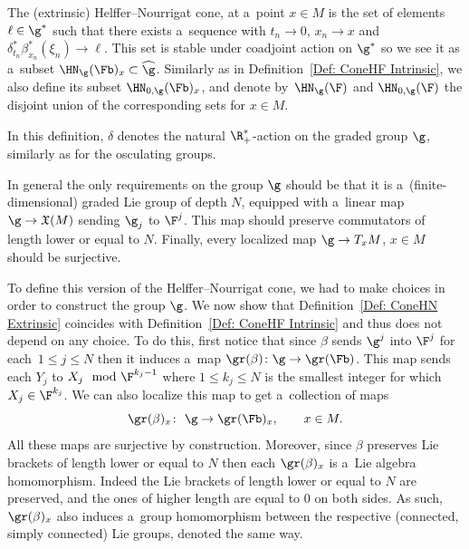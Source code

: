 \begin{mydef}\label{Def: ConeHN Extrinsic}
 The (extrinsic) Helffer--Nourrigat cone, at a~point $x\in M$ is the set of elements~${\ell \in \g^*}$ such that there exists a~sequence  with $t_n\rightarrow 0$, $x_n\rightarrow x$ and $\delta_{t_n}^*\beta_{x_n}^*(\xi_n) \rightarrow \ell$.
 This set is stable under coadjoint action on $\g^*$ so we see it as a~subset $\HN_{\g}(\Fb)_x \subset \widehat{\g}$. Similarly as in Definition~\ref{Def: ConeHF Intrinsic}, we also define its subset $\HN_{0,\g}(\Fb)_x$, and denote by~$\HN_{\g}(\F)$ and $\HN_{0,\g}(\F)$ the disjoint union of the corresponding sets for $x\in M$.
\end{mydef}

In this definition, $\delta$ denotes the natural $\R^*_+$-action on the graded group $\g$, similarly as for the osculating groups.

\begin{rem}
 In general the only requirements on the group $\g$ should be that it is a~(finite-dimensional) graded Lie group of depth $N$, equipped with a~linear map $\g \to \mathfrak{X}(M)$ sending $\g_j$ to $\F^j$. This map should preserve commutators of length lower or equal to $N$. Finally, every localized map $\g \to T_xM$, $x\in M$ should be surjective.
\end{rem}

To define this version of the Helffer--Nourrigat cone, we had to make choices in order to construct the group $\g$. We now show that Definition~\ref{Def: ConeHN Extrinsic} coincides with Definition~\ref{Def: ConeHF Intrinsic} and thus does not depend on any choice. To do this, first notice that since $\beta$ sends $\g^j$ into $\F^j$ for each~${1\leq j \leq N}$ then it induces a~map $\gr(\beta) \colon \g \to \gr(\Fb)$.
This map sends each $Y_j$ to $X_j \mod \F^{k_j-1}$ where $1\leq k_j\leq N$ is the smallest integer for which $X_j \in \F^{k_j}$. We can also localize this map to get a~collection of maps
\[\gr(\beta)_x \colon\ \g \to \gr(\Fb)_x,\qquad x \in M.\]
All these maps are surjective by construction. Moreover, since $\beta$ preserves Lie brackets of length lower or equal to $N$ then each $\gr(\beta)_x$ is a~Lie algebra homomorphism. Indeed the Lie brackets of length lower or equal to $N$ are preserved, and the ones of higher length are equal to $0$ on both sides. As such, $\gr(\beta)_x$ also induces a~group homomorphism between the respective (connected, simply connected) Lie groups, denoted the same way.

